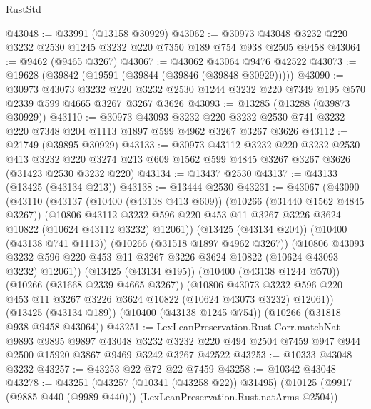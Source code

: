 \begin{lexlean}{RustStd}
\begin{coremodule}
@43048 := @33991 (@13158 @30929)
@43062 := @30973 @43048 @3232 @220 @3232 @2530 @1245 @3232 @220 @7350 @189 @754 @938 @2505 @9458
@43064 := @9462 (@9465 @3267)
@43067 := @43062 @43064 @9476 @42522
@43073 := @19628 (@39842 (@19591 (@39844 (@39846 (@39848 @30929)))))
@43090 := @30973
    @43073
    @3232
    @220
    @3232
    @2530
    @1244
    @3232
    @220
    @7349
    @195
    @570
    @2339
    @599
    @4665
    @3267
    @3267
    @3626
@43093 := @13285 (@13288 (@39873 @30929))
@43110 := @30973
    @43093
    @3232
    @220
    @3232
    @2530
    @741
    @3232
    @220
    @7348
    @204
    @1113
    @1897
    @599
    @4962
    @3267
    @3267
    @3626
@43112 := @21749 (@39895 @30929)
@43133 := @30973
    @43112
    @3232
    @220
    @3232
    @2530
    @413
    @3232
    @220
    @3274
    @213
    @609
    @1562
    @599
    @4845
    @3267
    @3267
    @3626
    (@31423 @2530 @3232 @220)
@43134 := @13437 @2530
@43137 := @43133 (@13425 (@43134 @213))
@43138 := @13444 @2530
@43231 := @43067
    (@43090
      (@43110
        (@43137
          (@10400 (@43138 @413 @609))
          (@10266 (@31440 @1562 @4845 @3267))
          (@10806
            @43112
            @3232
            @596
            @220
            @453
            @11
            @3267
            @3226
            @3624
            @10822
            (@10624 @43112 @3232)
            @12061))
        (@13425 (@43134 @204))
        (@10400 (@43138 @741 @1113))
        (@10266 (@31518 @1897 @4962 @3267))
        (@10806
          @43093
          @3232
          @596
          @220
          @453
          @11
          @3267
          @3226
          @3624
          @10822
          (@10624 @43093 @3232)
          @12061))
      (@13425 (@43134 @195))
      (@10400 (@43138 @1244 @570))
      (@10266 (@31668 @2339 @4665 @3267))
      (@10806
        @43073
        @3232
        @596
        @220
        @453
        @11
        @3267
        @3226
        @3624
        @10822
        (@10624 @43073 @3232)
        @12061))
    (@13425 (@43134 @189))
    (@10400 (@43138 @1245 @754))
    (@10266 (@31818 @938 @9458 @43064))
@43251 := LexLeanPreservation.Rust.Corr.matchNat
    @9893
    @9895
    @9897
    @43048
    @3232
    @3232
    @220
    @494
    @2504
    @7459
    @947
    @944
    @2500
    @15920
    @3867
    @9469
    @3242
    @3267
    @42522
@43253 := @10333 @43048 @3232
@43257 := @43253 @22 @72 @22 @7459
@43258 := @10342 @43048
@43278 := @43251
    (@43257 (@10341 (@43258 @22)) @31495)
    (@10125 (@9917 (@9885 @440 (@9989 @440))) (LexLeanPreservation.Rust.natArms @2504))

\end{coremodule}
\end{lexlean}
